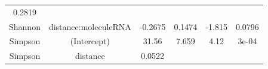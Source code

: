 \documentclass[]{article}
\begin{document}
\begin{longtable}[]{@{}cccccc@{}}
\begin{minipage}[t]{0.09\columnwidth}
0.2819\strut
\end{minipage}\tabularnewline
\begin{minipage}[t]{0.12\columnwidth}\centering\strut
Shannon\strut
\end{minipage} & \begin{minipage}[t]{0.24\columnwidth}\centering\strut
distance:moleculeRNA\strut
\end{minipage} & \begin{minipage}[t]{0.11\columnwidth}\centering\strut
-0.2675\strut
\end{minipage} & \begin{minipage}[t]{0.14\columnwidth}\centering\strut
0.1474\strut
\end{minipage} & \begin{minipage}[t]{0.12\columnwidth}\centering\strut
-1.815\strut
\end{minipage} & \begin{minipage}[t]{0.09\columnwidth}\centering\strut
0.0796\strut
\end{minipage}\tabularnewline
\begin{minipage}[t]{0.12\columnwidth}\centering\strut
Simpson\strut
\end{minipage} & \begin{minipage}[t]{0.24\columnwidth}\centering\strut
(Intercept)\strut
\end{minipage} & \begin{minipage}[t]{0.11\columnwidth}\centering\strut
31.56\strut
\end{minipage} & \begin{minipage}[t]{0.14\columnwidth}\centering\strut
7.659\strut
\end{minipage} & \begin{minipage}[t]{0.12\columnwidth}\centering\strut
4.12\strut
\end{minipage} & \begin{minipage}[t]{0.09\columnwidth}\centering\strut
3e-04\strut
\end{minipage}\tabularnewline
\begin{minipage}[t]{0.12\columnwidth}\centering\strut
Simpson\strut
\end{minipage} & \begin{minipage}[t]{0.24\columnwidth}\centering\strut
distance\strut
\end{minipage} & \begin{minipage}[t]{0.11\columnwidth}\centering\strut
0.0522\strut
\end{minipage} & \begin{minipage}[t]{0.14\columnwidth}\centering\strut

\end{minipage}
\end{longtable}
\end{document}
